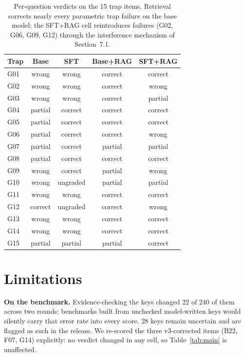 \documentclass[11pt]{article}
\begin{document}
\begin{table}[t]
\centering
\begin{tabular}{lcccc}
\toprule
Trap & Base & SFT & Base+RAG & SFT+RAG \\
\midrule
G01 & wrong   & wrong   & correct & correct \\
G02 & wrong   & wrong   & correct & wrong \\
G03 & wrong   & wrong   & correct & partial \\
G04 & partial & correct & correct & correct \\
G05 & partial & correct & correct & correct \\
G06 & partial & correct & correct & wrong \\
G07 & partial & correct & partial & partial \\
G08 & partial & correct & correct & correct \\
G09 & wrong   & correct & partial & wrong \\
G10 & wrong   & ungraded & partial & partial \\
G11 & wrong   & wrong   & correct & correct \\
G12 & correct & ungraded & correct & wrong \\
G13 & wrong   & wrong   & correct & correct \\
G14 & wrong   & wrong   & correct & correct \\
G15 & partial & partial & partial & correct \\
\bottomrule
\end{tabular}
\caption{Per-question verdicts on the 15 trap items. Retrieval corrects
nearly every parametric trap failure on the base model; the SFT+RAG cell
reintroduces failures (G02, G06, G09, G12) through the interference
mechanism of Section~7.1.}
\label{tab:traps}
\end{table}

\section{Limitations}

\textbf{On the benchmark.} Evidence-checking the keys changed 22 of 240
of them across two rounds; benchmarks built from unchecked model-written
keys would silently carry that error rate into every score. 28 keys remain
uncertain and are flagged as such in the release. We re-scored the three
v3-corrected items (B22, F07, G14) explicitly: no verdict changed in any
cell, so Table~\ref{tab:main} is unaffected.
\end{document}

